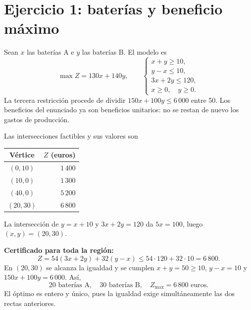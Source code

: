 \documentclass[11pt]{article}
\begin{document}
\section*{Ejercicio 1: baterías y beneficio máximo}

Sean $x$ las baterías A e $y$ las baterías B. El modelo es
\[
\max Z=130x+140y,\qquad
\begin{cases}x+y\geq10,\\y-x\leq10,\\3x+2y\leq120,\\x\geq0,\quad y\geq0.\end{cases}
\]
La tercera restricción procede de dividir $150x+100y\leq6\,000$ entre 50. Los beneficios del enunciado ya son beneficios unitarios: no se restan de nuevo los gastos de producción.

Las intersecciones factibles y sus valores son
\begin{center}
\begin{tabular}{c|r}
Vértice & $Z$ (euros)\\\hline
$(0,10)$ & $1\,400$\\
$(10,0)$ & $1\,300$\\
$(40,0)$ & $5\,200$\\
$(20,30)$ & $6\,800$
\end{tabular}
\end{center}
La intersección de $y=x+10$ y $3x+2y=120$ da $5x=100$, luego $(x,y)=(20,30)$.

\textbf{Certificado para toda la región:}
\[Z=54(3x+2y)+32(y-x)\leq54\cdot120+32\cdot10=6\,800.\]
En $(20,30)$ se alcanza la igualdad y se cumplen $x+y=50\geq10$, $y-x=10$ y $150x+100y=6\,000$. Así,
\[\boxed{20\text{ baterías A},\quad30\text{ baterías B},\quad Z_{\max}=6\,800\text{ euros}}.\]
El óptimo es entero y único, pues la igualdad exige simultáneamente las dos rectas anteriores.
\begin{center}
\end{center}
\clearpage
\end{document}

